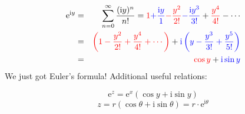 \documentclass{article}
\newcommand{\mathe}{\mathrm{e}}
\newcommand{\mathi}{\mathrm{i}}
\newcommand{\tmcolor}[2]{{\color{#1}{#2}}}
\begin{document}
\begin{eqnarray*}
  \mathe^{\mathi y} & = & \sum_{n = 0}^{\infty} \frac{(\mathi y)^n}{n!} =
  \tmcolor{red}{1} \tmcolor{blue}{+ \frac{\mathi y}{1}} \tmcolor{red}{-
  \frac{y^2}{2!}} \tmcolor{blue}{- \frac{\mathi y^3}{3!}} +
  \tmcolor{red}{\frac{y^4}{4!}} - \cdots\\
  & = & \tmcolor{red}{\left( 1 - \frac{y^2}{2!} + \frac{y^4}{4!} + \cdots
  \right)} + \tmcolor{blue}{\mathi \left( y - \frac{y^3}{3!} + \frac{y^5}{5!}
  \right)}\\
  & = & \tmcolor{red}{\cos y} + \tmcolor{blue}{\mathi \sin y}
\end{eqnarray*}
We just got Euler's formula! Additional useful relations:

\begin{tmframed}
  \[ \mathe^z = \mathe^x (\cos y + \mathi \sin y) \]
  \[ z = r (\cos \theta + \mathi \sin \theta) = r \cdot \mathe^{\mathi \theta}
  \]
\end{tmframed}
\end{document}
